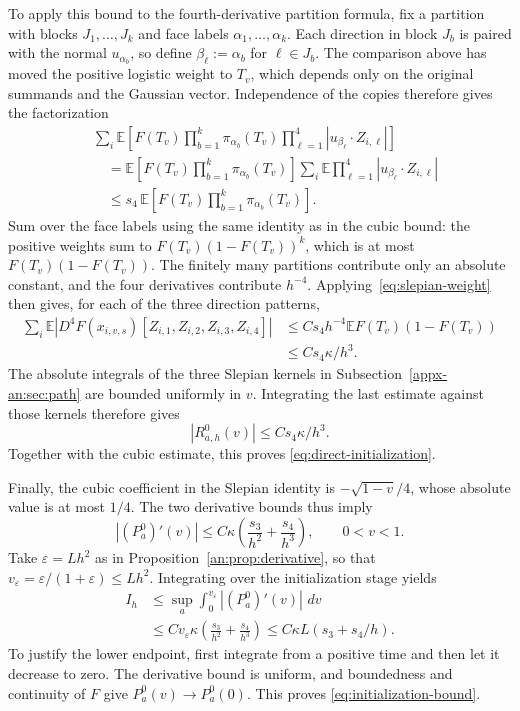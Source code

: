 \documentclass[11pt,letterpaper]{article}
\theoremstyle{remark}
\newcommand{\E}{\mathbb E}
\newcommand{\dd}{\,d}
\begin{document}
To apply this bound to the fourth-derivative partition formula,
fix a partition with blocks $J_1,\ldots,J_k$ and face labels
$\alpha_1,\ldots,\alpha_k$. Each direction in block $J_b$ is paired
with the normal $u_{\alpha_b}$, so define
$\beta_\ell:=\alpha_b$ for $\ell\in J_b$.
The comparison above has moved the positive logistic weight to
$T_v$, which depends only on the original summands and the Gaussian
vector. Independence of the copies therefore gives the factorization
\[
 \begin{aligned}
 &\sum_i\E\!\left[
   F(T_v)\prod_{b=1}^k\pi_{\alpha_b}(T_v)
   \prod_{\ell=1}^4|u_{\beta_\ell}\cdot Z_{i,\ell}|\right]\\
 &\quad=\E\!\left[F(T_v)\prod_{b=1}^k\pi_{\alpha_b}(T_v)\right]
       \sum_i\E\prod_{\ell=1}^4|u_{\beta_\ell}\cdot Z_{i,\ell}|\\
 &\quad\le s_4\,\E\!\left[
       F(T_v)\prod_{b=1}^k\pi_{\alpha_b}(T_v)\right].
 \end{aligned}
\]
Sum over the face labels using the same identity as in the cubic
bound: the positive weights sum to $F(T_v)(1-F(T_v))^k$,
which is at most $F(T_v)(1-F(T_v))$. The finitely many partitions
contribute only an absolute constant, and the four derivatives
contribute $h^{-4}$. Applying~\eqref{eq:slepian-weight} then gives,
for each of the three direction patterns,
\[
 \begin{aligned}
 \sum_i\E\left|
   D^4F(x_{i,v,s})[Z_{i,1},Z_{i,2},Z_{i,3},Z_{i,4}]
          \right|
 &\le Cs_4h^{-4}\E F(T_v)(1-F(T_v))\\
 &\le Cs_4\kappa/h^3.
 \end{aligned}
\]
The absolute integrals of the three Slepian kernels in
Subsection~\ref{appx-an:sec:path} are bounded uniformly in \(v\).
Integrating the last estimate against those kernels therefore gives
\[
 |R^0_{a,h}(v)|\le Cs_4\kappa/h^3.
\]
Together with the cubic estimate, this proves
\eqref{eq:direct-initialization}.

Finally, the cubic coefficient in the Slepian identity is
\(-\sqrt{1-v}/4\), whose absolute value is at most \(1/4\).
The two derivative bounds thus imply
\[
 |(P_a^0)'(v)|
 \le C\kappa\left(\frac{s_3}{h^2}+\frac{s_4}{h^3}\right),
 \qquad 0<v<1.
\]
Take \(\varepsilon=Lh^2\) as in
Proposition~\ref{an:prop:derivative}, so that
\(v_\varepsilon=\varepsilon/(1+\varepsilon)\le Lh^2\).
Integrating over the initialization stage yields
\[
 \begin{aligned}
 I_h&\le\sup_a\int_0^{v_\varepsilon}|(P_a^0)'(v)|\,\dd v\\
 &\le C v_\varepsilon\kappa
       \left(\frac{s_3}{h^2}+\frac{s_4}{h^3}\right)
 \le C\kappa L(s_3+s_4/h).
 \end{aligned}
\]
To justify the lower endpoint, first integrate from a positive
time and then let it decrease to zero. The derivative bound is
uniform, and boundedness and continuity of \(F\) give
\(P_a^0(v)\to P_a^0(0)\). This proves
\eqref{eq:initialization-bound}.
\end{document}
